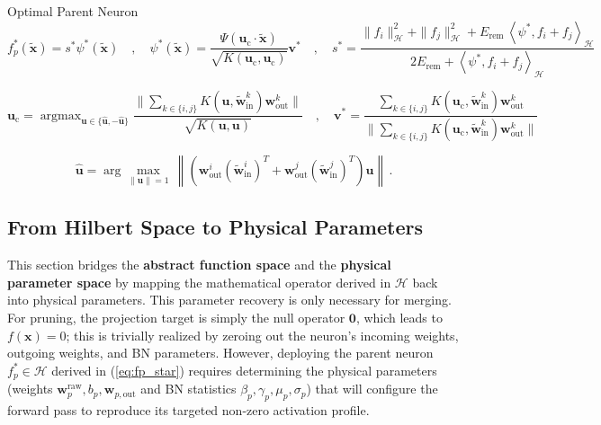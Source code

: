 \documentclass[11pt, a4paper, copyright, gdm]{google}
\newcommand{\norm}[1]{\left\lVert#1\right\rVert}
\newcommand{\normshort}[1]{\lVert#1\rVert}
\newcommand{\inner}[2]{\left\langle#1, #2\right\rangle}
\newcommand{\uVect}{\boldsymbol{u}}
\newcommand{\vVect}{\boldsymbol{v}}
\newcommand{\wVect}{\boldsymbol{w}}
\newcommand{\xVect}{\boldsymbol{x}}
\newcommand{\zeroVect}{\boldsymbol{0}}
\newcommand{\calH}{\mathcal{H}}
\DeclareMathOperator{\argmax}{argmax}
\theoremstyle{definition}
\begin{document}
\begin{insight}{Optimal Parent Neuron}
\begin{equation}
\label{eq:fp_star}
f_p^*(\tilde{\xVect}) = s^* \psi^*(\tilde{\xVect}) \quad,\quad \psi^*(\tilde{\xVect}) = \frac{\Psi(\uVect_{\text{c}} \cdot \tilde{\xVect})}{\sqrt{K(\uVect_{\text{c}},\uVect_{\text{c}})}} \vVect^* \quad,\quad s^* = \frac{\|f_i\|_{\calH}^2 + \|f_j\|_{\calH}^2 + E_{\text{rem}} \, \inner{\psi^*}{f_i+f_j}_{\calH}}{2 E_{\text{rem}} + \inner{\psi^*}{f_i+f_j}_{\calH}}
\end{equation}

\begin{equation}
\uVect_{\text{c}} = \argmax_{\uVect \in \{\widehat{\uVect},-\widehat{\uVect}\}} \frac{\normshort{\sum_{k \in \{i,j\}} K(\uVect, \tilde{\wVect}^k_{\text{in}}) \wVect^k_{\text{out}}}}{\sqrt{K(\uVect,\uVect)}} \quad,\quad \vVect^* = \frac{\sum_{k \in \{i,j\}} K(\uVect_{\text{c}}, \tilde{\wVect}^k_{\text{in}}) \wVect^k_{\text{out}}}{\normshort{\sum_{k \in \{i,j\}} K(\uVect_{\text{c}}, \tilde{\wVect}^k_{\text{in}}) \wVect^k_{\text{out}}}}
\end{equation}

\begin{equation}
\widehat{\uVect} = \arg\max_{\normshort{\uVect}=1} \, \norm{\left( \wVect^i_{\text{out}} (\tilde{\wVect}^i_{\text{in}})^T + \wVect^j_{\text{out}} (\tilde{\wVect}^j_{\text{in}})^T \right) \uVect} \,.
\end{equation}

\end{insight}

\subsection{From Hilbert Space to Physical Parameters}
This section bridges the \textbf{abstract function space} and the \textbf{physical parameter space} by mapping the mathematical operator derived in $\calH$ back into physical parameters. This parameter recovery is only necessary for merging. For pruning, the projection target is simply the null operator $\zeroVect$, which leads to $f(\xVect) = 0$; this is trivially realized by zeroing out the neuron's incoming weights, outgoing weights, and BN parameters. However, deploying the parent neuron $f_p^* \in \calH$ derived in (\ref{eq:fp_star}) requires determining the physical parameters (weights $\wVect^\text{raw}_p, b_p, \wVect_{p, \text{out}}$ and BN statistics $\beta_p, \gamma_p, \mu_p, \sigma_p$) that will configure the forward pass to reproduce its targeted non-zero activation profile.
\end{document}

